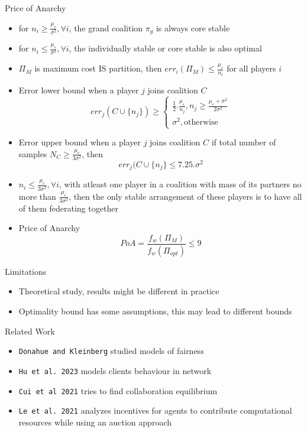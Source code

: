\documentclass[presentation]{beamer}
\begin{document}
\begin{frame}[label={sec:org2ba618f}]{Price of Anarchy}
\begin{itemize}
\item for \(n_i \geq \frac{\mu_e}{\sigma^2}, \forall i\), the grand coalition \(\pi_g\) is always core stable
\item for \(n_i \leq \frac{\mu_e}{\sigma^2}, \forall i\), the individually stable or core stable is also optimal
\item \(\Pi_M\) is maximum cost IS partition, then \(err_i(\Pi_M) \leq \frac{\mu_e}{n_i}\) for all players \(i\)
\end{itemize}

\begin{itemize}
\item Error lower bound when a player \(j\) joins coalition \(C\)
\[err_j(C \cup \{n_j\}) \geq \begin{cases} \frac{1}{2}.\frac{\mu_e}{n_j}, n_j \geq \frac{\mu_e + \sigma^2}{2\sigma^2} \\ \sigma^2, \text{otherwise}\end{cases}\]
\item Error upper bound when a player \(j\) joins coalition \(C\) if total number of samples \(N_C \geq \frac{\mu_e}{3\sigma^2}\), then
\[err_j(C \cup \{n_j\} \leq 7.25.\sigma^2\]
\end{itemize}

\begin{itemize}
\item \(n_i \leq \frac{\mu_e}{3\sigma^2}, \forall i\), with atleast one player in a coalition with mass of its partners no more than \(\frac{\mu_e}{3\sigma^2}\), then the only stable arrangement of these players is to have all of them federating together
\item Price of Anarchy
\[ PoA = \frac{f_w(\Pi_M)}{f_w(\Pi_{opt})} \leq 9\]
\end{itemize}
\end{frame}
\begin{frame}[label={sec:org4adb6a4}]{Limitations}
\begin{itemize}
\item Theoretical study, results might be different in practice
\item Optimality bound has some assumptions, this may lead to different bounds
\end{itemize}
\end{frame}
\begin{frame}[label={sec:orgabc9924},fragile]{Related Work}
 \begin{itemize}
\item \texttt{Donahue and Kleinberg} studied models of fairness
\item \texttt{Hu et al. 2023} models clients behaviour in network
\item \texttt{Cui et al 2021} tries to find collaboration equilibrium
\item \texttt{Le et al. 2021} analyzes incentives for agents to contribute computational resources while using an auction approach
\end{itemize}
\end{frame}
\end{document}
